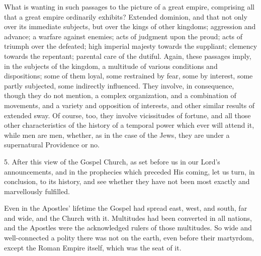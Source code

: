 What is wanting in such passages to the picture of a great empire,
comprising all that a great empire ordinarily exhibits? Extended
dominion, and that not only over its immediate subjects, but over the
kings of other kingdoms; aggression and advance; a warfare against
enemies; acts of judgment upon the proud; acts of triumph over the
defeated; high imperial majesty towards the suppliant; clemency
towards the repentant; parental care of the dutiful. Again, these
passages imply, in the subjects of the kingdom, a multitude of various
conditions and dispositions; some of them loyal, some restrained by
fear, some by interest, some partly subjected, some indirectly
influenced. They involve, in consequence, though they do not mention,
a complex organization, and a combination of movements, and a variety
and opposition of interests, and other similar results of extended
sway. Of course, too, they involve vicissitudes of fortune, and all
those other characteristics of the history of a temporal power which
ever will attend it, while men are men, whether, as in the case of the
Jews, they are under a supernatural Providence or no.

5. After this view of the Gospel Church, as set before us in our
Lord's announcements, and in the prophecies which preceded His coming,
let us turn, in conclusion, to its history, and see whether they have
not been most exactly and marvellously fulfilled.

Even in the Apostles' lifetime the Gospel had spread east, west,
and south, far and wide, and the Church with it. Multitudes had been
converted in all nations, and the Apostles were the acknowledged
rulers of those multitudes. So wide and well-connected a polity there
was not on the earth, even before their martyrdom, except the Roman
Empire itself, which was the seat of it.


